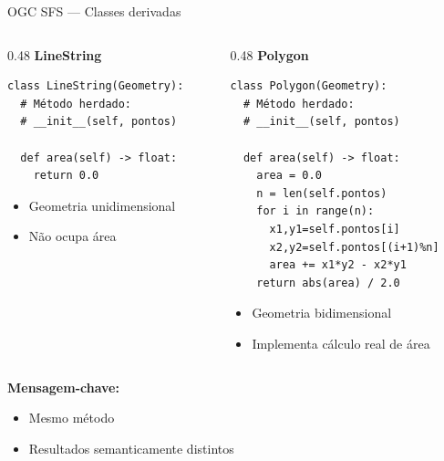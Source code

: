 \documentclass{beamer}
\begin{document}
\begin{frame}[fragile]{OGC SFS — Classes derivadas}
  
  \begin{columns}[t]
    
    \begin{column}{0.48\textwidth}
      \textbf{LineString}
      
      \vspace{0.2cm}
      
      \begin{verbatim}
class LineString(Geometry):
  # Método herdado:
  # __init__(self, pontos)

  def area(self) -> float:
    return 0.0
      \end{verbatim}
      
      \begin{itemize}
        \item Geometria unidimensional
        \item Não ocupa área
      \end{itemize}
    \end{column}
    
    \begin{column}{0.48\textwidth}
      \textbf{Polygon}
      
      \vspace{0.2cm}
      
      \begin{verbatim}
class Polygon(Geometry):
  # Método herdado:
  # __init__(self, pontos)

  def area(self) -> float:
    area = 0.0
    n = len(self.pontos)
    for i in range(n):
      x1,y1=self.pontos[i]
      x2,y2=self.pontos[(i+1)%n]
      area += x1*y2 - x2*y1
    return abs(area) / 2.0
      \end{verbatim}
      
      \begin{itemize}
        \item Geometria bidimensional
        \item Implementa cálculo real de área
      \end{itemize}
    \end{column}
    
  \end{columns}
  
  
  \textbf{Mensagem-chave:}
  \begin{itemize}
    \item Mesmo método
    \item Resultados semanticamente distintos
  \end{itemize}
  
\end{frame}
\end{document}
